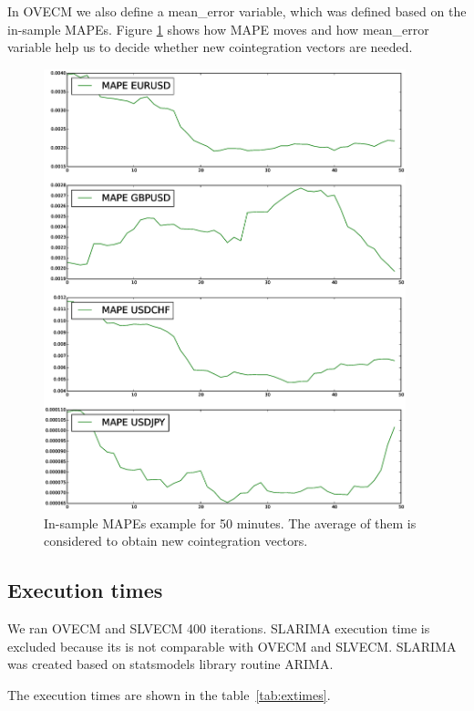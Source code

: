 In OVECM we also define a mean\_error variable, which was defined based on the
in-sample MAPEs. Figure \ref{fig:mapes} shows how MAPE moves and how mean\_error
variable help us to decide whether new cointegration vectors are needed.

\begin{figure}[!h]
  \centering
   \includegraphics[width = 10.5cm]{img/mapes} 
  \caption{In-sample MAPEs example for 50 minutes. The average of them is
  considered to obtain new cointegration vectors.}
  \label{fig:mapes}
 \end{figure}



\subsection{Execution times} \label{sec:exectimes}
We ran OVECM and SLVECM 400 iterations. SLARIMA execution time is excluded
because its is not comparable with OVECM and SLVECM. SLARIMA was created based
on statsmodels library routine ARIMA.

The execution times are shown in the table~\ref{tab:extimes}.


